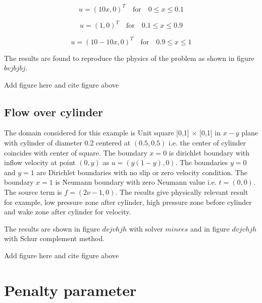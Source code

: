 \documentclass[a4paper,12pt]{book}
\begin{document}
\begin{center}

\begin{equation}
u = (10x,0)^T \quad \textrm{for} \quad 0 \leq x \leq 0.1
\end{equation}

\begin{equation}
u = (1,0)^T \quad \textrm{for} \quad 0.1 \leq x \leq 0.9
\end{equation}

\begin{equation}
u = (10 - 10x,0)^T \quad \textrm{for} \quad 0.9 \leq x \leq 1
\end{equation}

\end{center}

The results are found to reproduce the physics of the problem as shown in figure $bvjbjbj$.

\begin{Huge}
Add figure here and cite figure above
\end{Huge}

\subsection{Flow over cylinder}

The domain considered for this example is Unit square [0,1] $\times$ [0,1] in $x-y$ plane with cylinder of diameter 0.2 centered at $(0.5,0.5)$ i.e. the center of cylinder coincides with center of square. The boundary ${x=0}$ is dirichlet boundary with inflow velocity at point $(0,y)$ as $u = (y(1-y), 0)$. The boundaries ${y = 0}$ and ${y = 1}$ are Dirichlet boundaries with no slip or zero velocity condition. The boundary ${x = 1}$ is Neumann boundary with zero Neumann value i.e. $t = (0, 0)$. The source term is $f = (2 \nu - 1, 0)$. The results give physically relevant result for example, low pressure zone after cylinder, high pressure zone before cylinder and wake zone after cylinder for velocity.

The results are shown in figure $dvjvhjh$ with solver $minres$ and in figure $dvjvhjh$ with Schur complement method.

\begin{Huge}
Add figure here and cite figure above
\end{Huge}

\section{Penalty parameter}
\end{document}
